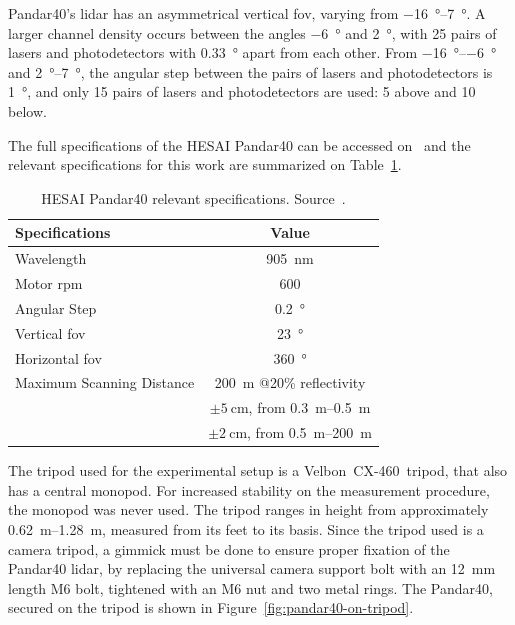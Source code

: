 Pandar40's \ac{lidar} has an asymmetrical vertical \ac{fov}, varying from \SIrange{-16}{+7}{\degree}. A larger channel density occurs between the angles \SI{-6}{\degree} and \SI{+2}{\degree}, with 25 pairs of lasers and photodetectors with \SI{0.33}{\degree} apart from each other. From \SIrange{-16}{-6}{\degree} and \SIrange{+2}{+7}{\degree}, the angular step between the pairs of lasers and photodetectors is \SI{1}{\degree}, and only 15 pairs of lasers and photodetectors are used: 5 above and 10 below.

The full specifications of the HESAI Pandar40 can be accessed on~\cite{Pandar40UserGuide} and the relevant specifications for this work are summarized on Table~\ref{tab:pandar40-specs}.

\begin{table}[!ht]
\centering
\renewcommand{\arraystretch}{1.2}
\begin{tabular}{@{}p{6cm}c@{}}
	\toprule
	Specifications & Value \\
	\midrule
	Wavelength & \SI{905}{\nano\meter} \\
	Motor \ac{rpm} & 600 \\
	Angular Step & \SI{0.2}{\degree} \\
	Vertical \ac{fov} & \SI{23}{\degree} \\
	Horizontal \ac{fov} & \SI{360}{\degree} \\
	Maximum Scanning Distance & \SI{200}{\meter} @20\% reflectivity \\
																				 & $\pm \SI{5}{\centi\meter}$, from \SIrange{0.3}{0.5}{\meter} \\
	\rowcolor{white} \multirow{-2}{*}{Measurement Accuracy} & $\pm \SI{2}{\centi\meter}$, from \SIrange{0.5}{200}{\meter} \\
	\bottomrule
\end{tabular}
\caption[HESAI Pandar40 relevant specifications.]{HESAI Pandar40 relevant specifications. Source~\cite{Pandar40UserGuide}.}
\label{tab:pandar40-specs}
\end{table}

The tripod used for the experimental setup is a Velbon\cp~CX-460\texttrademark~tripod, that also has a central monopod. For increased stability on the measurement procedure, the monopod was never used. The tripod ranges in height from approximately \SIrange{0.62}{1.28}{\meter}, measured from its feet to its basis. Since the tripod used is a camera tripod, a gimmick must be done to ensure proper fixation of the Pandar40 \ac{lidar}, by replacing the universal camera support bolt with an \SI{12}{\milli\meter} length M6 bolt, tightened with an M6 nut and two metal rings. The Pandar40, secured on the tripod is shown in Figure~\ref{fig:pandar40-on-tripod}.

